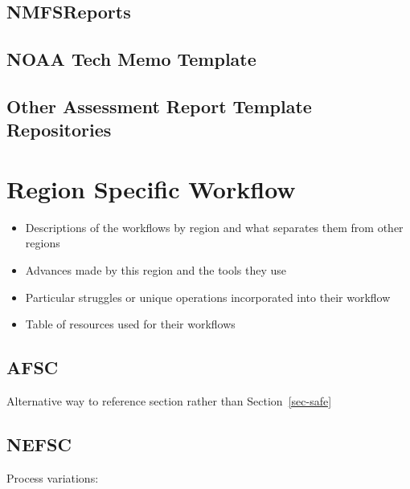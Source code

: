 \documentclass[
  letterpaper,
  DIV=11,
  numbers=noendperiod]{scrreprt}
\begin{document}
\section{NMFSReports}\label{sec-nmfsreports}

\section{NOAA Tech Memo Template}\label{sec-noaatechmemo}

\section{Other Assessment Report Template
Repositories}\label{sec-othertemplates}


\chapter{Region Specific Workflow}\label{sec-regionworkflows}

\begin{itemize}
\item
  Descriptions of the workflows by region and what separates them from
  other regions
\item
  Advances made by this region and the tools they use
\item
  Particular struggles or unique operations incorporated into their
  workflow
\item
  Table of resources used for their workflows
\end{itemize}

\section{AFSC}\label{sec-afsc}

Alternative way to reference section  rather than
Section~\ref{sec-safe}

\section{NEFSC}\label{sec-nefsc}

Process variations:
\end{document}
